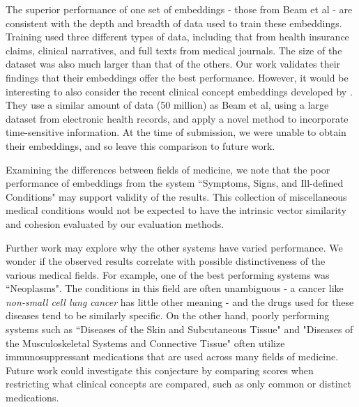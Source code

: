 \documentclass[11pt,a4paper]{article}
\begin{document}
The superior performance of one set of embeddings - those from Beam et al  - are consistent with the depth and breadth of data used to train these embeddings. Training used three different types of data, including that from health insurance claims, clinical narratives, and full texts from medical journals. The size of the dataset was also much larger than that of the others. Our work validates their findings that their embeddings offer the best performance. However, it would be interesting to also consider the recent clinical concept embeddings developed by \cite{xiangTimesensitiveClinicalConcept2019}. They use a similar amount of data (50 million) as Beam et al, using a large dataset from electronic health records, and apply a novel method to incorporate time-sensitive information. At the time of submission, we were unable to obtain their embeddings, and so leave this comparison to future work.

Examining the differences between fields of medicine, we note that the poor performance of embeddings from the system ``Symptoms, Signs, and Ill-defined Conditions" may support validity of the results. This collection of miscellaneous medical conditions would not be expected to have the intrinsic vector similarity and cohesion evaluated by our evaluation methods.   

Further work may explore why the other systems have varied performance. We wonder if the observed results correlate with possible distinctiveness of the various medical fields. For example, one of the best performing systems was ``Neoplasms". The conditions in this field are often unambiguous - a cancer like \emph{non-small cell lung cancer} has little other meaning - and the drugs used for these diseases tend to be similarly specific. On the other hand,  poorly performing systems such as ``Diseases of the Skin and Subcutaneous Tissue" and "Diseases of the Musculoskeletal Systems and Connective Tissue" often utilize immunosuppressant medications that are used across many fields of medicine. Future work could investigate this conjecture by comparing scores when restricting what clinical concepts are compared, such as only common or distinct medications. 
\end{document}
